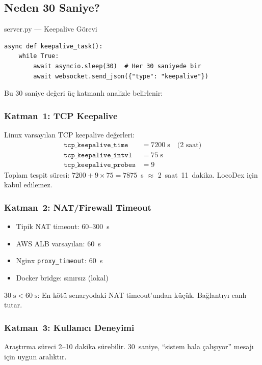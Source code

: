 \subsection{Neden 30 Saniye?}
\label{sec:keepalive-why30}

\begin{kodref}{server.py --- Keepalive G\"{o}revi}
\begin{lstlisting}
async def keepalive_task():
    while True:
        await asyncio.sleep(30)  # Her 30 saniyede bir
        await websocket.send_json({"type": "keepalive"})
\end{lstlisting}
\end{kodref}

Bu 30 saniye de\u{g}eri \"{u}\c{c} katmanl{\i} analizle belirlenir:

\subsubsection{Katman~1: TCP Keepalive}
Linux varsay{\i}lan TCP keepalive de\u{g}erleri:
\begin{align}
\texttt{tcp\_keepalive\_time}   &= 7200\;\text{s} \quad \text{(2 saat)} \\
\texttt{tcp\_keepalive\_intvl}  &= 75\;\text{s} \\
\texttt{tcp\_keepalive\_probes} &= 9
\end{align}
Toplam tespit s\"{u}resi: $7200 + 9 \times 75 = 7875$~s $\approx$ 2~saat~11~dakika. LocoDex i\c{c}in kabul edilemez.

\subsubsection{Katman~2: NAT/Firewall Timeout}
\begin{itemize}
  \item Tipik NAT timeout: 60--300~s
  \item AWS ALB varsay{\i}lan: 60~s
  \item Nginx \texttt{proxy\_timeout}: 60~s
  \item Docker bridge: s{\i}n{\i}rs{\i}z (lokal)
\end{itemize}
$30\;\text{s} < 60\;\text{s}$: En k\"{o}t\"{u} senaryodaki NAT timeout'undan k\"{u}\c{c}\"{u}k. Ba\u{g}lant{\i}y{\i} canl{\i} tutar.

\subsubsection{Katman~3: Kullan{\i}c{\i} Deneyimi}
Ara\c{s}t{\i}rma s\"{u}reci 2--10 dakika s\"{u}rebilir. 30~saniye, ``sistem hala \c{c}al{\i}\c{s}{\i}yor'' mesaj{\i} i\c{c}in uygun aral{\i}kt{\i}r.

